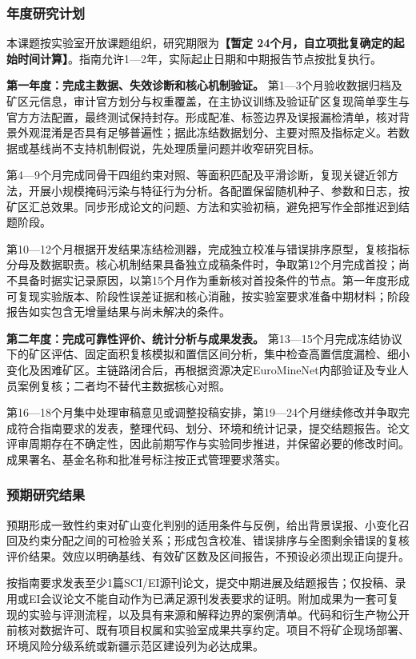 \justifying
\NSFCBodyText

\subsubsection{年度研究计划}
本课题按实验室开放课题组织，研究期限为\textbf{【暂定 24个月，自立项批复确定的起始时间计算】}。指南允许1—2年，实际起止日期和中期报告节点按批复执行。

\textbf{第一年度：完成主数据、失效诊断和核心机制验证。}
第1—3个月验收数据归档及矿区元信息，审计官方划分与权重覆盖，在主协议训练及验证矿区复现简单孪生与官方方法配置，最终测试保持封存。形成配准、标签边界及误报漏检清单，核对背景外观混淆是否具有足够普遍性；据此冻结数据划分、主要对照及指标定义。若数据或基线尚不支持机制假说，先处理质量问题并收窄研究目标。

第4—9个月完成同骨干四组约束对照、等面积匹配及平滑诊断，复现关键近邻方法，开展小规模掩码污染与特征行为分析。各配置保留随机种子、参数和日志，按矿区汇总效果。同步形成论文的问题、方法和实验初稿，避免把写作全部推迟到结题阶段。

第10—12个月根据开发结果冻结检测器，完成独立校准与错误排序原型，复核指标分母及数据职责。核心机制结果具备独立成稿条件时，争取第12个月完成首投；尚不具备时据实记录原因，以第15个月作为重新核对首投条件的节点。第一年度形成可复现实验版本、阶段性误差证据和核心消融，按实验室要求准备中期材料；阶段报告如实包含无增量结果与尚未解决的条件。

\textbf{第二年度：完成可靠性评价、统计分析与成果发表。}
第13—15个月完成冻结协议下的矿区评估、固定面积复核模拟和置信区间分析，集中检查高置信度漏检、细小变化及困难矿区。主链路闭合后，再根据资源决定EuroMineNet内部验证及专业人员案例复核；二者均不替代主数据核心对照。

第16—18个月集中处理审稿意见或调整投稿安排，第19—24个月继续修改并争取完成符合指南要求的发表，整理代码、划分、环境和统计记录，提交结题报告。论文评审周期存在不确定性，因此前期写作与实验同步推进，并保留必要的修改时间。成果署名、基金名称和批准号标注按正式管理要求落实。

\subsubsection{预期研究结果}
预期形成一致性约束对矿山变化判别的适用条件与反例，给出背景误报、小变化召回及约束分配之间的可检验关系；形成包含校准、错误排序与全图剩余错误的复核评价结果。效应以明确基线、有效矿区数及区间报告，不预设必须出现正向提升。

按指南要求发表至少1篇SCI/EI源刊论文，提交中期进展及结题报告；仅投稿、录用或EI会议论文不能自动作为已满足源刊发表要求的证明。附加成果为一套可复现的实验与评测流程，以及具有来源和解释边界的案例清单。代码和衍生产物公开前核对数据许可、既有项目权属和实验室成果共享约定。项目不将矿企现场部署、环境风险分级系统或新疆示范区建设列为必达成果。
